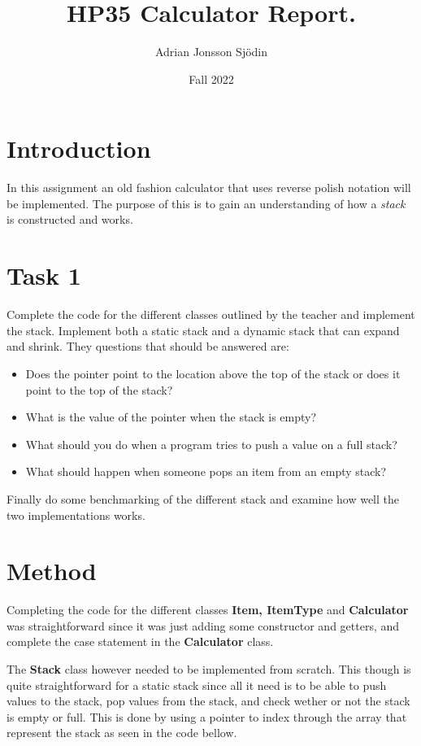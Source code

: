 \documentclass[a4paper,11pt]{article}
\begin{document}
\title{
  \textbf{HP35 Calculator Report.}
}
\author{Adrian Jonsson Sjödin}
\date{Fall 2022}

\maketitle

\section*{Introduction}
In this assignment an old fashion calculator that uses reverse polish notation will be
implemented. The purpose of this is to gain an understanding of how a \textit{stack} is
constructed and works.

\section*{Task 1}

Complete the code for the different classes outlined by the teacher and implement the stack.
Implement both a static stack and a dynamic stack that can expand and shrink.
They questions that should be answered are:
\begin{itemize}
  \item Does the pointer point to the location above the top of the stack or does it
        point to the top of the stack?
  \item What is the value of the pointer when the stack is empty?
  \item What should you do when a program tries to push a value on a full stack?
  \item What should happen when someone pops an item from an empty stack?
\end{itemize}
Finally do some benchmarking of the different stack and examine how well the two implementations
works.
\section*{Method}

Completing the code for the different classes \textbf{Item, ItemType} and \textbf{Calculator}
was straightforward since it was just adding some constructor and getters, and complete the
case statement in the \textbf{Calculator} class.

The \textbf{Stack} class however needed to be implemented from scratch. This though is quite
straightforward for a static stack since all it need is to be able to push values to the stack,
pop values from the stack, and check wether or not the stack is empty or full. This is done
by using a pointer to index through the array that represent the stack as seen in the code bellow.
\end{document}
